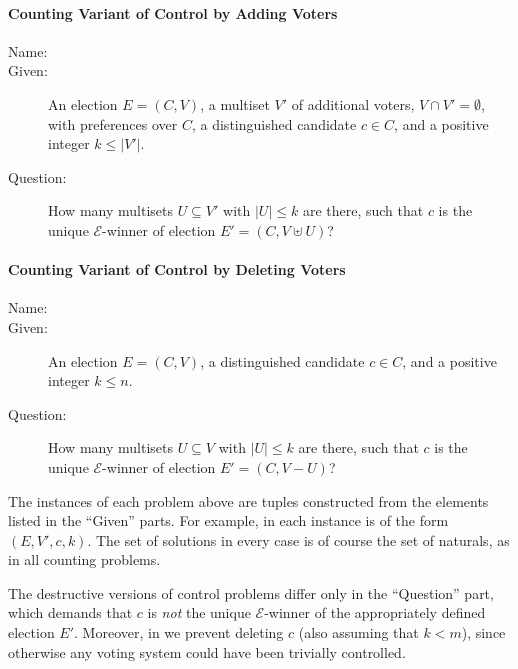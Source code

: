 \paragraph{Counting Variant of Control by Adding Voters}
\begin{description}
	\item[Name:] 
	\item[Given:] An election $E=(C,V)$, a multiset $V'$ of additional voters, $V\cap V'=\emptyset$, with preferences over $C$, a distinguished candidate $c\in C$, and a positive integer $k\le|V'|$.
	\item[Question:] How many multisets $U\subseteq V'$ with $|U|\le k$ are there, such that $c$ is the unique $\mathcal{E}$-winner of election $E'=(C,V\uplus U)$?
\end{description}

\paragraph{Counting Variant of Control by Deleting Voters}
\begin{description}
	\item[Name:] 
	\item[Given:] An election $E=(C,V)$, a distinguished candidate $c\in C$, and a positive integer $k\le n$.
	\item[Question:] How many multisets $U\subseteq V$ with $|U|\le k$ are there, such that $c$ is the unique $\mathcal{E}$-winner of election $E'=(C,V-U)$?
\end{description}

\bigskip
The instances of each problem above are tuples constructed from the elements listed in the ``Given'' parts.
For example, in  each instance is of the form $(E,V',c,k)$.
The set of solutions in every case is of course the set of naturals, as in all counting problems.

The destructive versions of control problems differ only in the ``Question'' part, which demands that $c$ is \emph{not} the unique $\mathcal{E}$-winner of the appropriately defined election $E'$.
Moreover, in  we prevent deleting $c$ (also assuming that $k<m$), since otherwise any voting system could have been trivially controlled.

